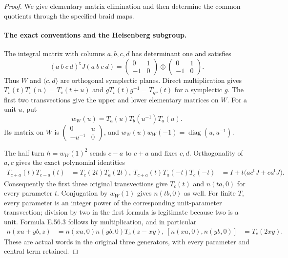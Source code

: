\begin{proof}
We give elementary matrix elimination and then determine
the common quotients through the specified braid maps.

\paragraph{The exact conventions and the Heisenberg subgroup.}
The integral matrix with columns $a,b,c,d$ has determinant
one and satisfies
\[
 (a\ b\ c\ d)^{\mathsf t}J(a\ b\ c\ d)
       =\begin{pmatrix}0&1\\-1&0\end{pmatrix}
                       \oplus
        \begin{pmatrix}0&1\\-1&0\end{pmatrix}.
 \tag{E.56.7}
\]
Thus $W$ and $\langle c,d\rangle$ are orthogonal
symplectic planes. Direct multiplication gives
$T_v(t)T_v(u)=T_v(t+u)$ and
$gT_v(t)g^{-1}=T_{gv}(t)$ for a symplectic $g$.
The first two transvections give the upper and lower
elementary matrices on $W$. For a unit $u$, put
\[
 w_W(u)=T_a(u)T_b(u^{-1})T_a(u).
 \tag{E.56.8}
\]
Its matrix on $W$ is
$\left(\begin{smallmatrix}0&u\\-u^{-1}&0\end{smallmatrix}\right)$,
and $w_W(u)w_W(-1)=\operatorname{diag}(u,u^{-1})$.

The half turn $h=w_W(1)^2$ sends $c-a$ to $c+a$
and fixes $c,d$. Orthogonality of $a,c$ gives the
exact polynomial identities
\[
 \begin{split}
 T_{c+a}(t)T_{c-a}(t)&=T_c(2t)T_a(2t),\
 T_{c+a}(t)T_a(-t)T_c(-t)
      &=I+t\bigl(a c^{\mathsf t}J+c a^{\mathsf t}J\bigr).
 \end{split}
 \tag{E.56.9}
\]
Consequently the first three original transvections
give $T_c(t)$ and $n(ta,0)$ for every parameter $t$.
Conjugation by $w_W(1)$ gives $n(tb,0)$ as well.
For finite $T$, every parameter is an integer power
of the corresponding unit-parameter transvection;
division by two in the first formula is legitimate
because two is a unit. Formula E.56.3 follows by
multiplication, and in particular
\[
 \begin{split}
 n(xa+yb,z)&=n(xa,0)n(yb,0)T_c(z-xy),\
 [n(xa,0),n(yb,0)]&=T_c(2xy).
 \end{split}
 \tag{E.56.10}
\]
These are actual words in the original three
generators, with every parameter and central term
retained.


\end{proof}
